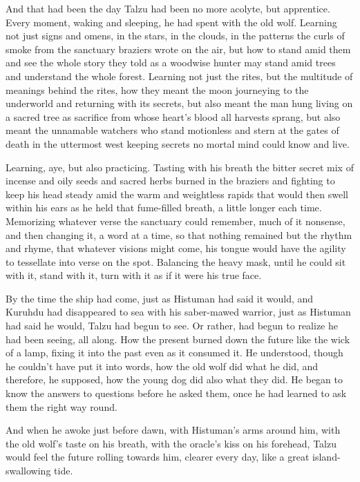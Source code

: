 And that had been the day Talzu had been no more acolyte, but apprentice. Every moment, waking and sleeping, he had spent with the old wolf. Learning not just signs and omens, in the stars, in the clouds, in the patterns the curls of smoke from the sanctuary braziers wrote on the air, but how to stand amid them and see the whole story they told as a woodwise hunter may stand amid trees and understand the whole forest. Learning not just the rites, but the multitude of meanings behind the rites, how they meant the moon journeying to the underworld and returning with its secrets, but also meant the man hung living on a sacred tree as sacrifice from whose heart's blood all harvests sprang, but also meant the unnamable watchers who stand motionless and stern at the gates of death in the uttermost west keeping secrets no mortal mind could know and live.

Learning, aye, but also practicing. Tasting with his breath the bitter secret mix of incense and oily seeds and sacred herbs burned in the braziers and fighting to keep his head steady amid the warm and weightless rapids that would then swell within his ears as he held that fume-filled breath, a little longer each time. Memorizing whatever verse the sanctuary could remember, much of it nonsense, and then changing it, a word at a time, so that nothing remained but the rhythm and rhyme, that whatever visions might come, his tongue would have the agility to tessellate into verse on the spot. Balancing the heavy mask, until he could sit with it, stand with it, turn with it as if it were his true face.

By the time the ship had come, just as Histuman had said it would, and Kuruhdu had disappeared to sea with his saber-mawed warrior, just as Histuman had said he would, Talzu had begun to see. Or rather, had begun to realize he had been seeing, all along. How the present burned down the future like the wick of a lamp, fixing it into the past even as it consumed it. He understood, though he couldn't have put it into words, how the old wolf did what he did, and therefore, he supposed, how the young dog did also what they did. He began to know the answers to questions before he asked them, once he had learned to ask them the right way round.

And when he awoke just before dawn, with Histuman's arms around him, with the old wolf's taste on his breath, with the oracle's kiss on his forehead, Talzu would feel the future rolling towards him, clearer every day, like a great island-swallowing tide.


